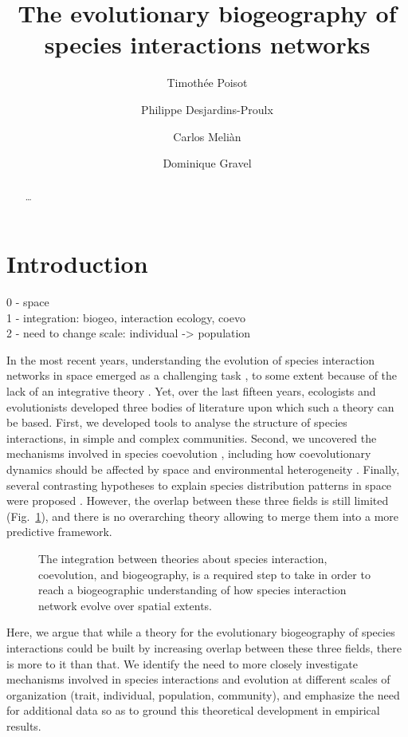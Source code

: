 \documentclass[11pt,oneside]{article}
\title{The evolutionary biogeography of species interactions networks}
\author{
    Timoth\'ee Poisot
        \and
    Philippe Desjardins-Proulx
        \and
    Carlos Meli\`an
        \and
    Dominique Gravel
    }
\begin{document}
\maketitle
\begin{abstract}
	\ldots 
\end{abstract}
\onehalfspacing\clearpage


\section{Introduction}

0 - space\\
1 - integration: biogeo, interaction ecology, coevo\\
2 - need to change scale: individual -> population

In the most recent years, understanding the evolution of species interaction
networks in space emerged as a challenging task \parencite{Pillai2011}, to some
extent because of the lack of an integrative theory \parencite{Urban2008}. Yet,
over the last fifteen years, ecologists and evolutionists developed three bodies
of literature upon which such a theory can be based. First, we developed tools
to analyse the structure of species interactions, in simple and complex
communities. Second, we uncovered the mechanisms involved in species coevolution
\parencite{Thompson1994a}, including how coevolutionary dynamics should be
affected by space and environmental heterogeneity \parencite{Thompson2005}.
Finally, several contrasting hypotheses to explain species distribution
patterns in space were proposed \parencite{O'Dwyer2010}. However, the overlap
between these three fields is still limited (Fig.~\ref{f:venn}), and there is
no overarching theory allowing to merge them into a more predictive framework.

\begin{figure}[htbp]
   \centering
   
   \caption{The integration between theories about species interaction,
   coevolution, and biogeography, is a required step to take in order to reach
   a biogeographic understanding of how species interaction network evolve
   over spatial extents.}
   \label{f:venn}
\end{figure}

Here, we argue that while a theory for the evolutionary biogeography of
species interactions could be built by increasing overlap between these three
fields, there is more to it than that. We identify the need to more closely
investigate mechanisms involved in species interactions and evolution at
different scales of organization (trait, individual, population, community),
and emphasize the need for additional data so as to ground this theoretical
development in empirical results.
\end{document}
